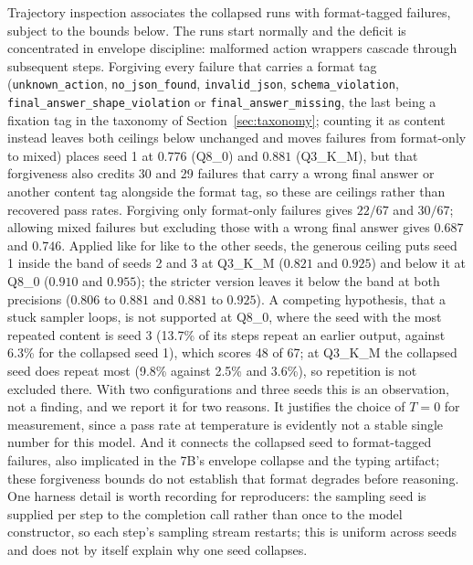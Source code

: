 \documentclass[11pt]{article}
\begin{document}
\begin{sloppypar}Trajectory inspection associates the collapsed runs with format-tagged failures, subject to the bounds below. The runs start normally and the deficit is concentrated in envelope discipline: malformed action wrappers cascade through subsequent steps. Forgiving every failure that carries a format tag (\texttt{unknown\_action}, \texttt{no\_json\_found}, \texttt{invalid\_json}, \texttt{schema\_violation}, \texttt{final\_answer\_shape\_violation} or \texttt{final\_answer\_missing}, the last being a fixation tag in the taxonomy of Section~\ref{sec:taxonomy}; counting it as content instead leaves both ceilings below unchanged and moves failures from format-only to mixed) places seed 1 at $0.776$ (Q8\_0) and $0.881$ (Q3\_K\_M), but that forgiveness also credits 30 and 29 failures that carry a wrong final answer or another content tag alongside the format tag, so these are ceilings rather than recovered pass rates. Forgiving only format-only failures gives $22/67$ and $30/67$; allowing mixed failures but excluding those with a wrong final answer gives $0.687$ and $0.746$. Applied like for like to the other seeds, the generous ceiling puts seed 1 inside the band of seeds 2 and 3 at Q3\_K\_M ($0.821$ and $0.925$) and below it at Q8\_0 ($0.910$ and $0.955$); the stricter version leaves it below the band at both precisions ($0.806$ to $0.881$ and $0.881$ to $0.925$). A competing hypothesis, that a stuck sampler loops, is not supported at Q8\_0, where the seed with the most repeated content is seed 3 (13.7\% of its steps repeat an earlier output, against 6.3\% for the collapsed seed 1), which scores 48 of 67; at Q3\_K\_M the collapsed seed does repeat most (9.8\% against 2.5\% and 3.6\%), so repetition is not excluded there. With two configurations and three seeds this is an observation, not a finding, and we report it for two reasons. It justifies the choice of $T=0$ for measurement, since a pass rate at temperature is evidently not a stable single number for this model. And it connects the collapsed seed to format-tagged failures, also implicated in the 7B's envelope collapse and the typing artifact; these forgiveness bounds do not establish that format degrades before reasoning. One harness detail is worth recording for reproducers: the sampling seed is supplied per step to the completion call rather than once to the model constructor, so each step's sampling stream restarts; this is uniform across seeds and does not by itself explain why one seed collapses.\end{sloppypar}
\end{document}
